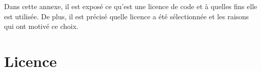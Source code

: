 Dans cette annexe, il est exposé ce qu'est une licence de code et à quelles fins elle est utilisée.
De plus, il est précisé quelle licence a été sélectionnée et les raisons qui ont motivé ce choix.

\section{Licence}

